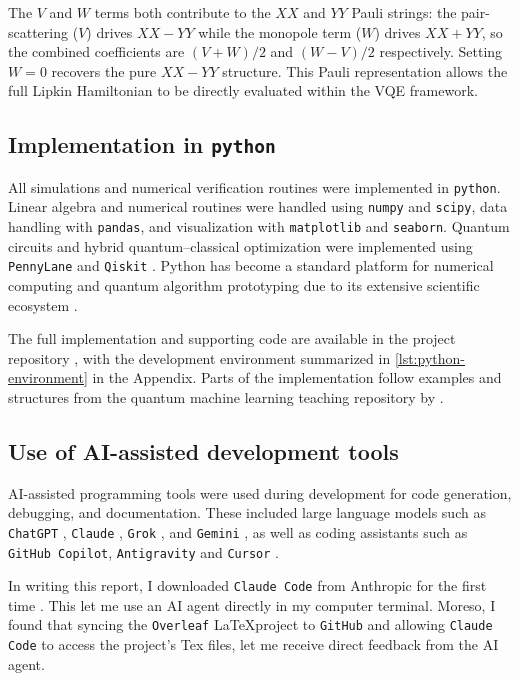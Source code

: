 The $V$ and $W$ terms both contribute to the $XX$ and $YY$ Pauli strings: the pair-scattering ($V$) drives $XX-YY$ while the monopole term ($W$) drives $XX+YY$, so the combined coefficients are $(V+W)/2$ and $(W-V)/2$ respectively. Setting $W=0$ recovers the pure $XX-YY$ structure. This Pauli representation allows the full Lipkin Hamiltonian to be directly evaluated within the VQE framework.

\subsection{Implementation in \texttt{python}}

All simulations and numerical verification routines were implemented in \texttt{python}. Linear algebra and numerical routines were handled using \texttt{numpy} and \texttt{scipy}, data handling with \texttt{pandas}, and visualization with \texttt{matplotlib} and \texttt{seaborn}. Quantum circuits and hybrid quantum–classical optimization were implemented using \texttt{PennyLane} and \texttt{Qiskit} \parencite{numpy,pennylane,qiskit}. Python has become a standard platform for numerical computing and quantum algorithm prototyping due to its extensive scientific ecosystem \parencite{pattanayak2021qmlpython,hundt2026qcp,hidary2019qcaa}.

The full implementation and supporting code are available in the project repository \parencite{fys5419-repo, claudoverius-repo}, with the development environment summarized in \cref{lst:python-environment} in the Appendix. Parts of the implementation follow examples and structures from the quantum machine learning teaching repository by \textcite{compphysics_qcml_repo}.

\subsection{Use of AI-assisted development tools}

AI-assisted programming tools were used during development for code generation, debugging, and documentation. These included large language models such as \texttt{ChatGPT} \parencite{chatgpt}, \texttt{Claude} \parencite{claude}, \texttt{Grok} \parencite{grok}, and \texttt{Gemini} \parencite{gemini}, as well as coding assistants such as \texttt{GitHub Copilot}, \texttt{Antigravity} and \texttt{Cursor} \parencite{copilot,google-antigravity,cursor}. 

In writing this report, I downloaded \texttt{Claude Code} from Anthropic for the first time \parencite{anthropic_claude_code_docs}. This let me use an AI agent directly in my computer terminal. Moreso, I found that syncing the \texttt{Overleaf} \LaTeX project to \texttt{GitHub} and allowing \texttt{Claude Code} to access the project's Tex files, let me receive direct feedback from the AI agent. 
